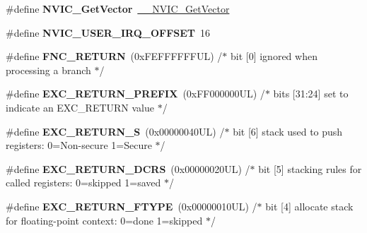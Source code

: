 \begin{DoxyCompactItemize}
\#define {\bfseries N\+V\+I\+C\+\_\+\+Get\+Vector}~\mbox{\hyperlink{group___c_m_s_i_s___core___n_v_i_c_functions_ga44b665d2afb708121d9b10c76ff00ee5}{\+\_\+\+\_\+\+N\+V\+I\+C\+\_\+\+Get\+Vector}}
\item 
\mbox{\label{group___c_m_s_i_s___core___n_v_i_c_functions_ga8045d905a5ca57437d8e6f71ffcb6df5}} 
\#define {\bfseries N\+V\+I\+C\+\_\+\+U\+S\+E\+R\+\_\+\+I\+R\+Q\+\_\+\+O\+F\+F\+S\+ET}~16
\item 
\mbox{\label{group___c_m_s_i_s___core___n_v_i_c_functions_gabaa62910bf89acc186ae998c611e64ab}} 
\#define {\bfseries F\+N\+C\+\_\+\+R\+E\+T\+U\+RN}~(0x\+F\+E\+F\+F\+F\+F\+F\+F\+U\+L)     /$\ast$ bit \mbox{[}0\mbox{]} ignored when processing a branch                             $\ast$/
\item 
\mbox{\label{group___c_m_s_i_s___core___n_v_i_c_functions_ga99e0c1c19f050880a8bd827a7f420bec}} 
\#define {\bfseries E\+X\+C\+\_\+\+R\+E\+T\+U\+R\+N\+\_\+\+P\+R\+E\+F\+IX}~(0x\+F\+F000000\+U\+L)     /$\ast$ bits \mbox{[}31\+:24\mbox{]} set to indicate an E\+X\+C\+\_\+\+R\+E\+T\+U\+R\+N value                     $\ast$/
\item 
\mbox{\label{group___c_m_s_i_s___core___n_v_i_c_functions_ga88711355d0196b1ffeb18c33e2c95360}} 
\#define {\bfseries E\+X\+C\+\_\+\+R\+E\+T\+U\+R\+N\+\_\+S}~(0x00000040\+U\+L)     /$\ast$ bit \mbox{[}6\mbox{]} stack used to push registers\+: 0=\+Non-\/secure 1=\+Secure          $\ast$/
\item 
\mbox{\label{group___c_m_s_i_s___core___n_v_i_c_functions_ga0a0f2c03b4aef2c02bdae044bda1324b}} 
\#define {\bfseries E\+X\+C\+\_\+\+R\+E\+T\+U\+R\+N\+\_\+\+D\+C\+RS}~(0x00000020\+U\+L)     /$\ast$ bit \mbox{[}5\mbox{]} stacking rules for called registers\+: 0=skipped 1=saved       $\ast$/
\item 
\mbox{\label{group___c_m_s_i_s___core___n_v_i_c_functions_ga342b51c3eec59822bf206e24ef881a9e}} 
\#define {\bfseries E\+X\+C\+\_\+\+R\+E\+T\+U\+R\+N\+\_\+\+F\+T\+Y\+PE}~(0x00000010\+U\+L)     /$\ast$ bit \mbox{[}4\mbox{]} allocate stack for floating-\/point context\+: 0=done 1=skipped  $\ast$/

\end{DoxyCompactItemize}

